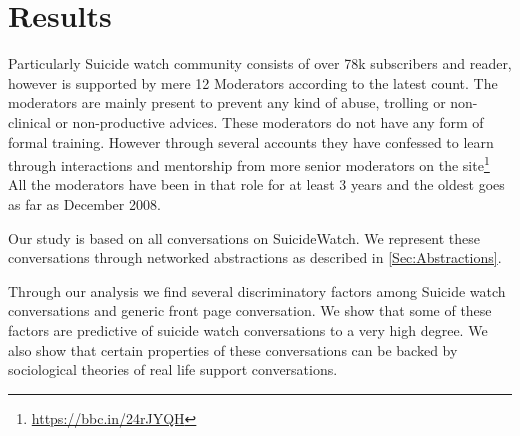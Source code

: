 


\section{Results}
Particularly Suicide watch community consists of over 78k subscribers and reader, however is supported by mere 12 Moderators according to the latest count. The moderators are mainly present to prevent any kind of abuse, trolling or non-clinical or non-productive advices. These moderators do not have any form of formal training. However through several accounts they have confessed to learn through interactions and mentorship from more senior moderators on the site\footnote{\url{https://bbc.in/24rJYQH}} All the moderators have been in that role for at least 3 years and the oldest goes as far as December 2008. 

Our study is based on all conversations on SuicideWatch.
We represent these conversations through networked abstractions as described in \ref{Sec:Abstractions}.

Through our analysis we find several discriminatory factors among Suicide watch conversations and generic front page conversation. We show that some of these factors are predictive of suicide watch conversations to a very high degree. We also show that certain properties of these conversations can be backed by sociological theories of real life support conversations. 

